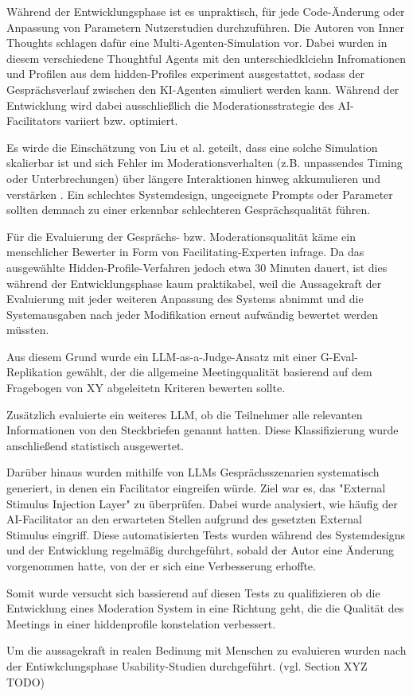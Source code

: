 Während der Entwicklungsphase ist es unpraktisch, für jede Code-Änderung oder Anpassung von Parametern
Nutzerstudien durchzuführen. Die Autoren von Inner Thoughts schlagen dafür eine Multi-Agenten-Simulation vor.
\cite["6 Simulative Evaluation"]{liuProactiveConversationalAgents2025}
Dabei wurden in diesem verschiedene Thoughtful Agents mit den unterschiedklciehn Infromationen und Profilen
aus dem hidden-Profiles experiment ausgestattet, sodass der Gesprächsverlauf zwischen den KI-Agenten
simuliert werden kann. Während der Entwicklung wird dabei
ausschließlich die Moderationsstrategie des AI-Facilitators variiert bzw. optimiert.

Es wirde die Einschätzung von Liu et al. geteilt, dass eine solche Simulation skalierbar ist und sich
Fehler im Moderationsverhalten (z.B. unpassendes Timing oder Unterbrechungen) über längere Interaktionen
hinweg akkumulieren und verstärken \cite["6 Simulative Evaluation"]{liuProactiveConversationalAgents2025}.
Ein schlechtes Systemdesign, ungeeignete Prompts oder Parameter sollten demnach zu einer erkennbar
schlechteren Gesprächsqualität führen.

Für die Evaluierung der Gesprächs- bzw. Moderationsqualität käme ein menschlicher Bewerter in Form von
Facilitating-Experten infrage.
Da das ausgewählte Hidden-Profile-Verfahren jedoch etwa 30 Minuten dauert, ist dies während der
Entwicklungsphase kaum praktikabel, weil die Aussagekraft der Evaluierung mit jeder weiteren Anpassung des
Systems abnimmt und die Systemausgaben nach jeder Modifikation erneut aufwändig bewertet werden müssten.

Aus diesem Grund wurde ein LLM-as-a-Judge-Ansatz mit einer G-Eval-Replikation gewählt, der die allgemeine
Meetingqualität basierend auf dem Fragebogen von XY abgeleitetn Kriteren bewerten sollte.

Zusätzlich evaluierte ein weiteres LLM, ob die Teilnehmer alle relevanten Informationen von den Steckbriefen
genannt hatten. Diese Klassifizierung wurde anschließend statistisch ausgewertet.

Darüber hinaus wurden mithilfe von LLMs Gesprächsszenarien systematisch generiert, in denen ein Facilitator
eingreifen würde. Ziel war es, das "External Stimulus Injection Layer" zu überprüfen. Dabei wurde analysiert,
wie häufig der AI-Facilitator an den erwarteten Stellen aufgrund des gesetzten External Stimulus eingriff.
Diese automatisierten Tests wurden während des Systemdesigns und der Entwicklung regelmäßig durchgeführt,
sobald der Autor eine Änderung vorgenommen hatte, von der er sich eine Verbesserung erhoffte.

Somit wurde versucht sich bassierend auf diesen Tests zu qualifizieren ob die Entwicklung eines Moderation
System in eine Richtung geht, die die Qualität des Meetings in einer hiddenprofile konstelation verbessert.

Um die aussagekraft in realen Bedinung mit Menschen zu evaluieren wurden nach der Entiwkclungsphase
Usability-Studien durchgeführt.
(vgl. Section XYZ TODO)